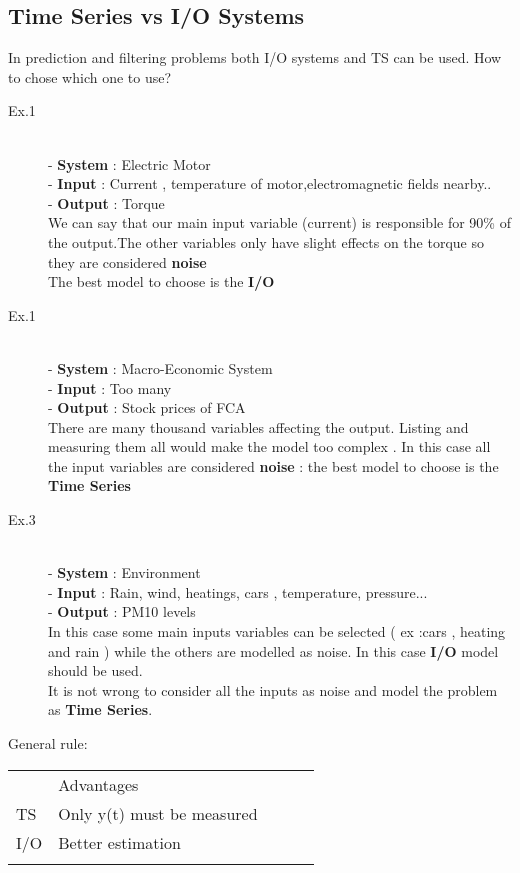 \subsection{Time Series vs I/O Systems} %
In prediction and filtering problems both I/O systems and TS can be used. 
How to chose which one to use?
\begin{description} %

\item[Ex.1] \hfill \\
- \textbf{System} : Electric Motor \\
- \textbf{Input} :  Current , temperature of motor,electromagnetic fields nearby..  \\
- \textbf{Output} : Torque \\
We can say that our main input variable (current) is responsible for 90\% of the output.The other variables only have slight effects on the torque so they are considered \textbf{noise} \\
The best model to choose is the \textbf{I/O}
\item[Ex.1] \hfill \\
- \textbf{System} : Macro-Economic System \\
- \textbf{Input} :  Too many  \\
- \textbf{Output} : Stock prices of FCA \\
There are many thousand variables affecting the output. Listing and measuring them all would make the model too complex . In this case all the input variables are considered \textbf{noise} : the best model to choose is the \textbf{Time Series}
\item[Ex.3] \hfill \\
- \textbf{System} : Environment \\
- \textbf{Input} :  Rain, wind, heatings, cars , temperature, pressure... \\
- \textbf{Output} : PM10 levels \\
In this case some main inputs variables can be selected ( ex :cars , heating and rain ) while the others are modelled as noise. In this case \textbf{I/O} model should be used. \\ It is not wrong to consider all the inputs as noise and model the problem as \textbf{Time Series}.
\end{description} 
\newpage
General rule:
\begin{table}[!ht]
\centering
\label{my-label}
\begin{tabular}{lllll}
\cline{1-2}
\multicolumn{1}{|l|}{}    & \multicolumn{1}{l|}{Advantages}                 &  &  &  \\ \cline{1-2}
\multicolumn{1}{|l|}{TS}  & \multicolumn{1}{l|}{Only y(t) must be measured} &  &  &  \\ \cline{1-2}
\multicolumn{1}{|l|}{I/O} & \multicolumn{1}{l|}{Better estimation}          &  &  &  \\ \cline{1-2}
                          &                                                 &  &  & 
\end{tabular}
\end{table}


